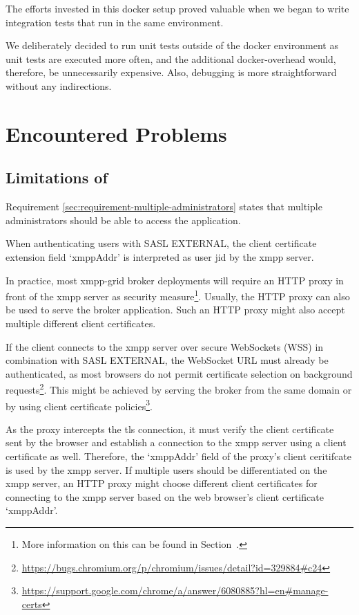 The efforts invested in this docker setup proved valuable when we began to write integration tests that run in the same environment.

We deliberately decided to run unit tests outside of the docker environment as unit tests are executed more often, and the additional docker-overhead would, therefore, be unnecessarily expensive.
Also, debugging is more straightforward without any indirections.

\section{Encountered Problems}\label{encountered-problems}

\subsection{Limitations of \emph{}}\label{sec:limitations-of-requirement-multiple-administrators}

Requirement \ref{sec:requirement-multiple-administrators} states that multiple administrators should be able to access the application.

When authenticating users with SASL EXTERNAL, the client certificate extension field `xmppAddr' is interpreted as user \gls{jid} by the \gls{xmpp} server.

In practice, most \gls{xmpp-grid} \gls{broker} deployments will require an HTTP proxy in front of the \gls{xmpp} server as security measure\footnote{
More information on this can be found in Section~.}.
Usually, the HTTP proxy can also be used to serve the \gls{broker} application.
Such an HTTP proxy might also accept multiple different client certificates.

If the client connects to the \gls{xmpp} server over secure WebSockets (WSS) in combination with SASL EXTERNAL, the WebSocket URL must already be authenticated, as most browsers do not permit certificate selection on background requests\footnote{\url{https://bugs.chromium.org/p/chromium/issues/detail?id=329884\#c24}}.
This might be achieved by serving the \gls{broker} from the same domain or by using client certificate policies\footnote{\url{https://support.google.com/chrome/a/answer/6080885?hl=en\#manage-certs}}.

As the proxy intercepts the \gls{tls} connection, it must verify the client certificate sent by the browser and establish a connection to the \gls{xmpp} server using a client certificate as well.
Therefore, the `xmppAddr' field of the proxy's client ceritifcate is used by the \gls{xmpp} server.
If multiple users should be differentiated on the \gls{xmpp} server, an HTTP proxy might choose different client certificates for connecting to the \gls{xmpp} server based on the web browser's client certificate `xmppAddr'.


